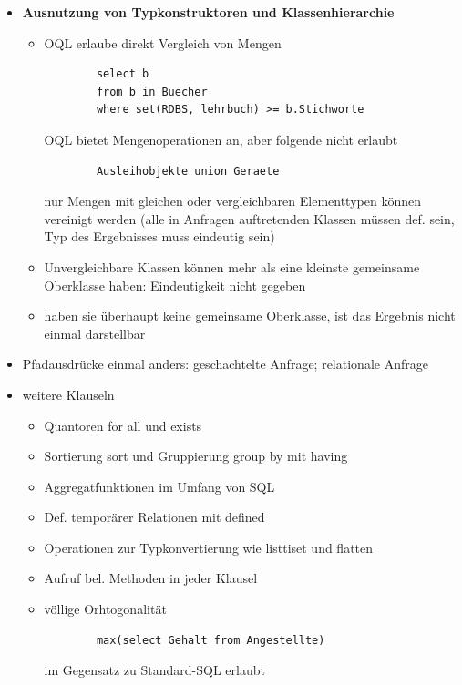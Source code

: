 \begin{itemize}
	\item \textbf{Ausnutzung von Typkonstruktoren und Klassenhierarchie}
	\begin{itemize}
		\item OQL erlaube direkt Vergleich von Mengen
		\begin{lstlisting}
		select b
		from b in Buecher
		where set(RDBS, lehrbuch) >= b.Stichworte
		\end{lstlisting}
		OQL bietet Mengenoperationen an, aber folgende nicht erlaubt
		\begin{lstlisting}
		Ausleihobjekte union Geraete
		\end{lstlisting}
		nur Mengen mit gleichen oder vergleichbaren Elementtypen können vereinigt werden (alle in Anfragen auftretenden Klassen müssen def. sein, Typ des Ergebnisses muss eindeutig sein)
		\item Unvergleichbare Klassen können mehr als eine kleinste gemeinsame Oberklasse haben: Eindeutigkeit nicht gegeben
		\item haben sie überhaupt keine gemeinsame Oberklasse, ist das Ergebnis nicht einmal darstellbar
	\end{itemize}
	
	\item Pfadausdrücke einmal anders: geschachtelte Anfrage; relationale Anfrage
	
	\item weitere Klauseln
	\begin{itemize}
		\item Quantoren for all und exists
		\item Sortierung sort und Gruppierung group by mit having
		\item Aggregatfunktionen im Umfang von SQL
		\item Def. temporärer Relationen mit defined
		\item Operationen zur Typkonvertierung wie listtiset und flatten
		\item Aufruf bel. Methoden in jeder Klausel
		\item völlige Orhtogonalität
		\begin{lstlisting}
		max(select Gehalt from Angestellte)
		\end{lstlisting}
		im Gegensatz zu Standard-SQL erlaubt
	\end{itemize}
\end{itemize}

